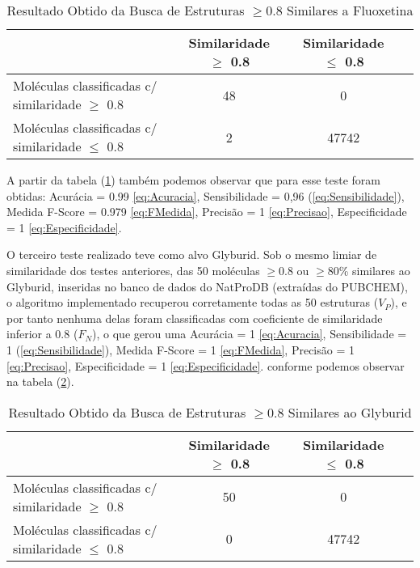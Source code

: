  \begin{table}[!htb]
	\centering
	\footnotesize
	\caption[Resultado Obtido da Busca de Estruturas $\geq$0.8 Similares a Fluoxetina]{Resultado Obtido da Busca de Estruturas $\geq$0.8 Similares a Fluoxetina}
	\label{tab:Fluoxetina}	
	\begin{tabular}{p{4cm}ccc}
		\hline \SPACE
		\textbf{}&\textbf{Similaridade $\geq $ 0.8} & \textbf{Similaridade $\leq $ 0.8} \\ \hline \SPACE
	Moléculas classificadas c/ similaridade $\geq $ 0.8  &	48 & 0 \\ \hline \SPACE
	Moléculas classificadas c/ similaridade $\leq $ 0.8  & 2 & 47742\\ \hline 
	\end{tabular}
\end{table}       
A partir da tabela (\ref{tab:Fluoxetina}) também podemos observar que para esse teste foram obtidas: Acurácia = 0.99 \eqref{eq:Acuracia}, Sensibilidade = 0,96 (\ref{eq:Sensibilidade}), Medida F-Score = 0.979 \eqref{eq:FMedida}, Precisão = 1 \eqref{eq:Precisao},  Especificidade = 1 \eqref{eq:Especificidade}.

O terceiro teste realizado teve como alvo Glyburid. Sob o mesmo limiar de similaridade dos testes anteriores, das 50 moléculas $\geq $0.8 ou $\geq $80\% similares ao Glyburid, inseridas no banco de dados do NatProDB (extraídas do PUBCHEM), o algoritmo implementado  recuperou corretamente todas as 50 estruturas ($V_P$), e por tanto nenhuma delas foram classificadas com coeficiente de similaridade inferior a 0.8 ($F_N$), o que gerou uma  Acurácia = 1 \eqref{eq:Acuracia}, Sensibilidade = 1 (\ref{eq:Sensibilidade}), Medida F-Score = 1 \eqref{eq:FMedida}, Precisão = 1 \eqref{eq:Precisao},  Especificidade = 1 \eqref{eq:Especificidade}. conforme podemos observar na tabela (\ref{tab:Glyburid}).

 \begin{table}[!htb]
	\centering
	\footnotesize
	\caption[Resultado Obtido da Busca de Estruturas $\geq$0.8 Similares ao Glyburid]{Resultado Obtido da Busca de Estruturas $\geq$0.8 Similares ao Glyburid}
	\label{tab:Glyburid}	
	\begin{tabular}{p{4cm}ccc}
		\hline \SPACE
		\textbf{}&\textbf{Similaridade $\geq $ 0.8} & \textbf{Similaridade $\leq $ 0.8} \\ \hline \SPACE
	Moléculas classificadas c/ similaridade $\geq $ 0.8  &	50 & 0 \\ \hline \SPACE
	Moléculas classificadas c/ similaridade $\leq $ 0.8  & 0 & 47742\\ \hline 
	\end{tabular}
\end{table} 


